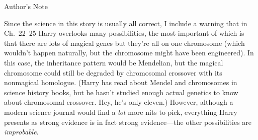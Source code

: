 \thispagestyle{empty}
{
\vspace*{6\baselineskip}
\itshape
\begin{center}
Author's Note
\end{center}

Since the science in this story is usually all correct, I include a warning
that in Ch.~22--25 Harry overlooks many possibilities, the most important of
which is that there are lots of magical genes but they're all on one chromosome
(which wouldn't happen naturally, but the chromosome might have been
engineered). In this case, the inheritance pattern would be Mendelian, but the
magical chromosome could still be degraded by chromosomal crossover with its
nonmagical homologue. (Harry has read about Mendel and chromosomes in science
history books, but he hasn't studied enough actual genetics to know about
chromosomal crossover. Hey, he's only eleven.) However, although a modern
science journal would find a \emph{lot} more nits to pick, everything Harry
presents as strong evidence is in fact strong evidence---the other
possibilities are \emph{improbable}.
}
